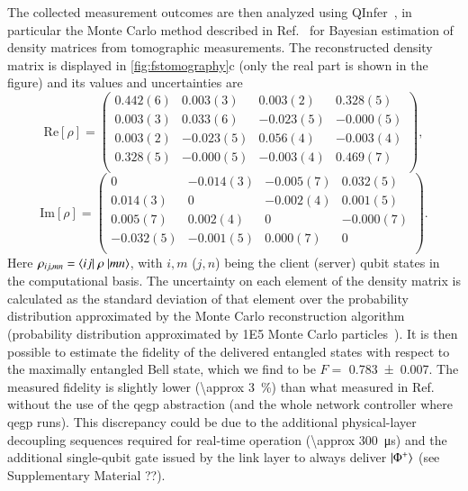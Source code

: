 The collected measurement outcomes are then analyzed using QInfer~\cite{granade_2017_qinfer}, in
particular the Monte Carlo method described in Ref.~\cite{granade_2016_practical} for Bayesian
estimation of density matrices from tomographic measurements. The reconstructed density matrix is
displayed in \cref{fig:fstomography}c (only the real part is shown in the figure) and its values and
uncertainties are
%
\begin{equation*}
    \mathrm{Re}[\rho] = \begin{pmatrix}
        0.442(6) & 0.003(3)  & 0.003(2)  & 0.328(5)  \\
        0.003(3) & 0.033(6)  & -0.023(5) & -0.000(5) \\
        0.003(2) & -0.023(5) & 0.056(4)  & -0.003(4) \\
        0.328(5) & -0.000(5) & -0.003(4) & 0.469(7)  \\
    \end{pmatrix},
\end{equation*}
%
\begin{equation*}
    \mathrm{Im}[\rho] = \begin{pmatrix}
        0         & -0.014(3) & -0.005(7) & 0.032(5)  \\
        0.014(3)  & 0         & -0.002(4) & 0.001(5)  \\
        0.005(7)  & 0.002(4)  & 0         & -0.000(7) \\
        -0.032(5) & -0.001(5) & 0.000(7)  & 0         \\
    \end{pmatrix}.
\end{equation*}
Here $\rho_{ij, mn} = \braket{ij|\ \rho\ |mn}$, with $i,m$ ($j,n$) being the client (server) qubit
states in the computational basis. The uncertainty on each element of the density matrix is
calculated as the standard deviation of that element over the probability distribution approximated
by the Monte Carlo reconstruction algorithm (probability distribution approximated by \num{1E5}
Monte Carlo particles~\cite{granade_2016_practical}). It is then possible to estimate the fidelity
of the delivered entangled states with respect to the maximally entangled Bell state, which we find
to be $F =$ \num{0.783(7)}. The measured fidelity is slightly lower (\qty{\approx 3}{\percent}) than
what measured in Ref.~\cite{pompili_2021_multinode} without the use of the \acrshort{qegp}
abstraction (and the whole network controller where \acrshort{qegp} runs). This discrepancy could be
due to the additional physical-layer decoupling sequences required for real-time operation
(\qty{\approx 300}{\us}) and the additional single-qubit gate issued by the link layer to always
deliver $\ket{\Phi^+}$ (see Supplementary Material ??).

